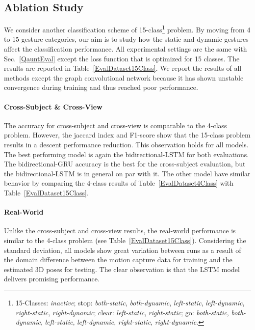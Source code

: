 \documentclass[letterpaper, 10 pt, conference]{ieeeconf}
\begin{document}
\subsection{Ablation Study}

We consider another classification scheme of 15-class\footnote{15-Classes: \emph{inactive}; stop: \emph{both-static}, \emph{both-dynamic}, \emph{left-static}, \emph{left-dynamic}, \emph{right-static}, \emph{right-dynamic}; clear: \emph{left-static}, \emph{right-static}; go: \emph{both-static}, \emph{both-dynamic}, \emph{left-static}, \emph{left-dynamic}, \emph{right-static}, \emph{right-dynamic}.} problem. By moving from 4 to 15 gesture categories, our aim is to study how the static and dynamic gestures affect the classification performance. All experimental settings are the same with Sec.~\ref{QauntEval} except the loss function that is optimized for 15 classes. The results are reported in Table~\ref{EvalDataset15Class}. We report the results of all methods except the graph convolutional network because it has shown unstable convergence during training and thus reached poor performance.

\paragraph{Cross-Subject \& Cross-View} The accuracy for cross-subject and cross-view is comparable to the 4-class problem. However, the jaccard index and F1-score show that the 15-class problem results in a descent performance reduction. This observation holds for all models. The best performing model is again the bidirectional-LSTM for both evaluations. The bidirectional-GRU accuracy is the best for the cross-subject evaluation, but the bidirectional-LSTM is in general on par with it. The other model have similar behavior by comparing the 4-class results of Table~\ref{EvalDataset4Class} with Table~\ref{EvalDataset15Class}.

\paragraph{Real-World} Unlike the cross-subject and cross-view results, the real-world performance is similar to the 4-class problem (see Table~\ref{EvalDataset15Class}). Considering the standard deviation, all models show great variation between runs as a result of the domain difference between the motion capture data for training and the estimated 3D poses for testing. The clear observation is that the LSTM model delivers promising performance.
\end{document}
